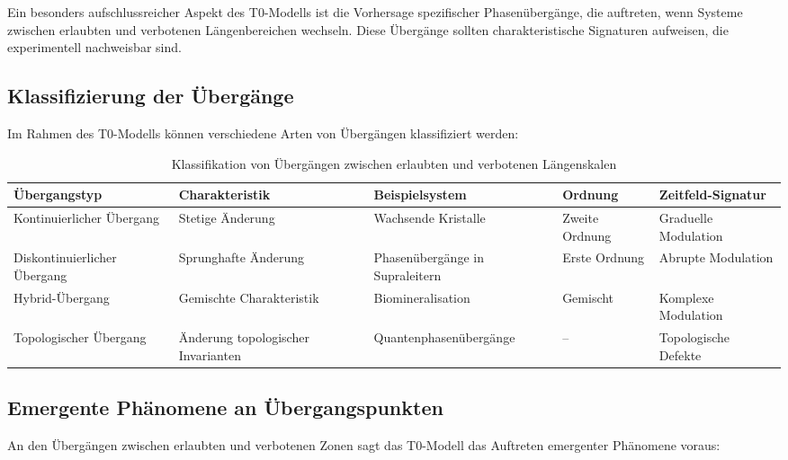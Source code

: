 \documentclass[12pt,a4paper]{article}
\begin{document}
	Ein besonders aufschlussreicher Aspekt des T0-Modells ist die Vorhersage spezifischer Phasenübergänge, die auftreten, wenn Systeme zwischen erlaubten und verbotenen Längen\-bereichen wechseln. Diese Übergänge sollten charakteristische Signaturen aufweisen, die experimentell nachweisbar sind.
	
	\subsection{Klassifizierung der Übergänge}
	\label{subsec:klassifizierung_uebergaenge}
	
	Im Rahmen des T0-Modells können verschiedene Arten von Übergängen klassifiziert werden:
	
	\begin{table}[h]
		\centering
		\begin{adjustbox}{scale=0.6}
			\begin{tabular}{lllll}
				\hline
				\textbf{Übergangstyp} & \textbf{Charakteristik} & \textbf{Beispielsystem} & \textbf{Ordnung} & \textbf{Zeitfeld-Signatur} \\
				\hline
				Kontinuierlicher Übergang & Stetige Änderung & Wachsende Kristalle & Zweite Ordnung & Graduelle Modulation \\
				Diskontinuierlicher Übergang & Sprunghafte Änderung & Phasenübergänge in Supraleitern & Erste Ordnung & Abrupte Modulation \\
				Hybrid-Übergang & Gemischte Charakteristik & Biomineralisation & Gemischt & Komplexe Modulation \\
				Topologischer Übergang & Änderung topologischer Invarianten & Quantenphasenübergänge & – & Topologische Defekte \\
				\hline
			\end{tabular}
		\end{adjustbox}
		\caption{Klassifikation von Übergängen zwischen erlaubten und verbotenen Längen\-skalen}
		\label{tab:transitions}
	\end{table}
	
	\subsection{Emergente Phänomene an Übergangspunkten}
	\label{subsec:emergente_phaenomene}
	
	An den Übergängen zwischen erlaubten und verbotenen Zonen sagt das T0-Modell das Auftreten emergenter Phänomene voraus:
	
\end{document}
